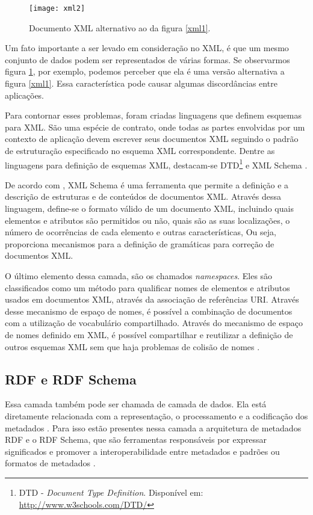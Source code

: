 \graphicspath{{figuras/}}
\begin{figure}[H]
\centering
\texttt{[image: xml2]}
\caption{Documento XML alternativo ao da figura \ref{xml1}.}
\label{xml2}
\end{figure}

Um fato importante a ser levado em consideração no XML, é que um mesmo conjunto de dados podem ser representados de várias formas. Se observarmos figura \ref{xml2}, por exemplo, podemos perceber que ela é uma versão alternativa a figura \ref{xml1}. Essa característica pode causar algumas discordâncias entre aplicações. 

Para contornar esses problemas, foram criadas linguagens que definem esquemas para XML. São uma espécie de contrato, onde todas as partes envolvidas por um contexto de aplicação devem escrever seus documentos XML seguindo o padrão de estruturação especificado no esquema XML correspondente. Dentre as linguagens para definição de esquemas XML, destacam-se DTD\footnote{DTD - \emph{Document Type Definition}. Disponível em: \url{http://www.w3schools.com/DTD/}} e XML Schema \cite{filholoscio}.

De acordo com \cite{rosa}, XML Schema é uma ferramenta que permite a definição e a descrição de estruturas e de conteúdos de documentos XML. Através dessa linguagem, define-se o formato válido de um documento XML, incluindo quais elementos e atributos são permitidos ou não, quais são as suas localizações, o número de ocorrências de cada elemento e outras características, Ou seja, proporciona mecanismos para a definição de gramáticas para correção de documentos XML.

O último elemento dessa camada, são os chamados \emph{namespaces}. Eles são classificados como um método para qualificar nomes de elementos e atributos usados em documentos XML, através da associação de referências URI. Através desse mecanismo de espaço de nomes, é possível a combinação de documentos com a utilização de vocabulário compartilhado. Através do mecanismo de espaço de nomes definido em XML, é possível compartilhar e reutilizar a definição de outros esquemas XML sem que haja problemas de colisão de nomes \cite{rosa} .

\subsection{RDF e RDF Schema}

Essa camada também pode ser chamada de camada de dados. Ela está diretamente relacionada com a representação, o processamento e a codificação dos metadados \cite{vesu}. Para isso estão presentes nessa camada a arquitetura de metadados RDF e o RDF Schema, que são ferramentas responsáveis por expressar significados e promover a interoperabilidade entre metadados e padrões ou formatos de metadados \cite{santarem}.

